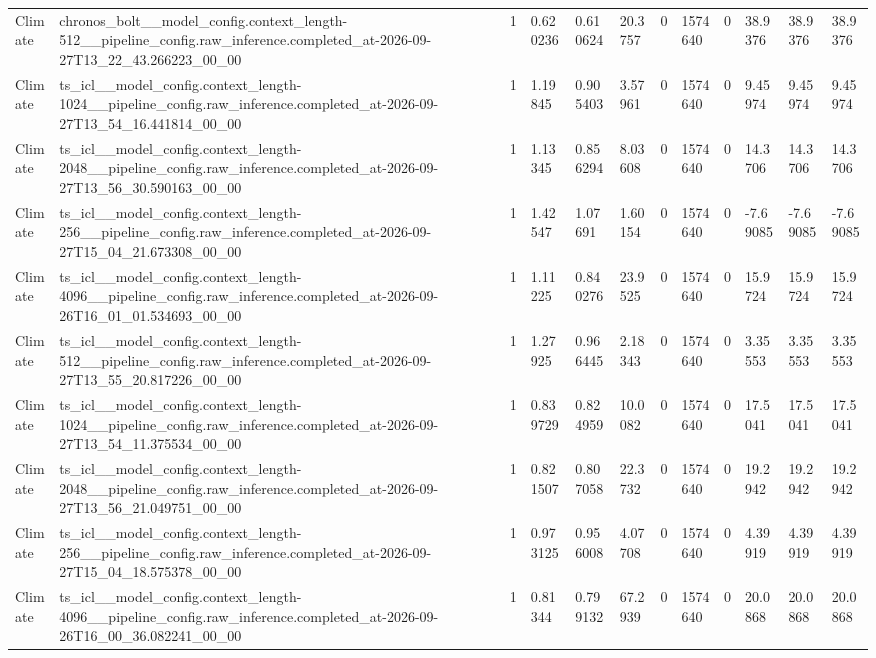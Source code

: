 \begin{tabular}{llllllllllll}
Climate & chronos\_bolt\_\_model\_config.context\_length-512\_\_pipeline\_config.raw\_inference.completed\_at-2026-09-27T13\_22\_43.266223\_00\_00 & 1 & 0.620236 & 0.610624 & 20.3757 & 0 & 1574640 & 0 & 38.9376 & 38.9376 & 38.9376 \\
Climate & ts\_icl\_\_model\_config.context\_length-1024\_\_pipeline\_config.raw\_inference.completed\_at-2026-09-27T13\_54\_16.441814\_00\_00 & 1 & 1.19845 & 0.905403 & 3.57961 & 0 & 1574640 & 0 & 9.45974 & 9.45974 & 9.45974 \\
Climate & ts\_icl\_\_model\_config.context\_length-2048\_\_pipeline\_config.raw\_inference.completed\_at-2026-09-27T13\_56\_30.590163\_00\_00 & 1 & 1.13345 & 0.856294 & 8.03608 & 0 & 1574640 & 0 & 14.3706 & 14.3706 & 14.3706 \\
Climate & ts\_icl\_\_model\_config.context\_length-256\_\_pipeline\_config.raw\_inference.completed\_at-2026-09-27T15\_04\_21.673308\_00\_00 & 1 & 1.42547 & 1.07691 & 1.60154 & 0 & 1574640 & 0 & -7.69085 & -7.69085 & -7.69085 \\
Climate & ts\_icl\_\_model\_config.context\_length-4096\_\_pipeline\_config.raw\_inference.completed\_at-2026-09-26T16\_01\_01.534693\_00\_00 & 1 & 1.11225 & 0.840276 & 23.9525 & 0 & 1574640 & 0 & 15.9724 & 15.9724 & 15.9724 \\
Climate & ts\_icl\_\_model\_config.context\_length-512\_\_pipeline\_config.raw\_inference.completed\_at-2026-09-27T13\_55\_20.817226\_00\_00 & 1 & 1.27925 & 0.966445 & 2.18343 & 0 & 1574640 & 0 & 3.35553 & 3.35553 & 3.35553 \\
Climate & ts\_icl\_\_model\_config.context\_length-1024\_\_pipeline\_config.raw\_inference.completed\_at-2026-09-27T13\_54\_11.375534\_00\_00 & 1 & 0.839729 & 0.824959 & 10.0082 & 0 & 1574640 & 0 & 17.5041 & 17.5041 & 17.5041 \\
Climate & ts\_icl\_\_model\_config.context\_length-2048\_\_pipeline\_config.raw\_inference.completed\_at-2026-09-27T13\_56\_21.049751\_00\_00 & 1 & 0.821507 & 0.807058 & 22.3732 & 0 & 1574640 & 0 & 19.2942 & 19.2942 & 19.2942 \\
Climate & ts\_icl\_\_model\_config.context\_length-256\_\_pipeline\_config.raw\_inference.completed\_at-2026-09-27T15\_04\_18.575378\_00\_00 & 1 & 0.973125 & 0.956008 & 4.07708 & 0 & 1574640 & 0 & 4.39919 & 4.39919 & 4.39919 \\
Climate & ts\_icl\_\_model\_config.context\_length-4096\_\_pipeline\_config.raw\_inference.completed\_at-2026-09-26T16\_00\_36.082241\_00\_00 & 1 & 0.81344 & 0.799132 & 67.2939 & 0 & 1574640 & 0 & 20.0868 & 20.0868 & 20.0868 \\

\end{tabular}
